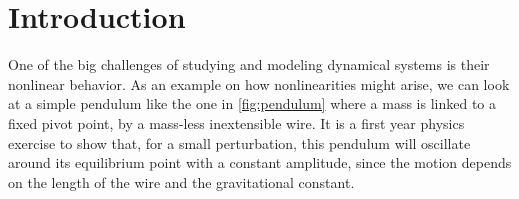 


\chapter{Introduction}




One of the big challenges of studying and modeling dynamical systems is their nonlinear behavior. 
As an example on how nonlinearities might arise, we can look at a simple pendulum like the one in \cref{fig:pendulum} where a mass is linked to a fixed pivot point, by a mass-less inextensible wire.
It is a first year physics exercise  to show that, for a small perturbation, this pendulum will oscillate around its equilibrium point with a constant amplitude, since the motion depends on the length of the wire and the gravitational constant. 

